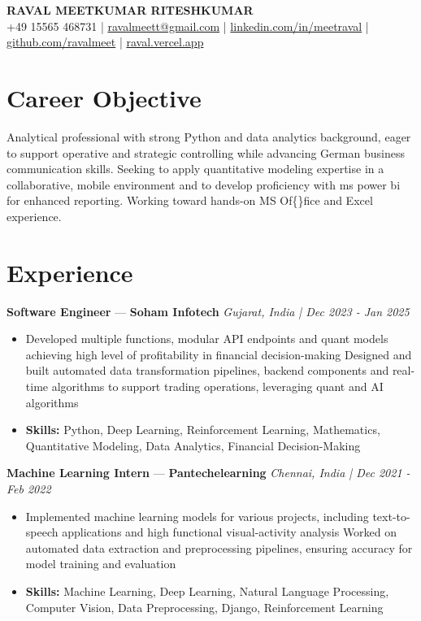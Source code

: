 \documentclass[a4paper,10pt]{article}
\begin{document}
\begin{center}
  {\Large\bfseries RAVAL MEETKUMAR RITESHKUMAR}\\[2pt]
  {\small +49 15565 468731 \;|\; \href{mailto:ravalmeett@gmail.com}{ravalmeett@gmail.com} \;|\; \href{https://www.linkedin.com/in/meetraval/}{linkedin.com/in/meetraval} \;|\; \href{https://github.com/ravalmeet}{github.com/ravalmeet} \;|\; \href{https://raval.vercel.app/}{raval.vercel.app}}
\end{center}
\vspace{-3pt}

\section*{Career Objective}
Analytical professional with strong Python and data analytics background, eager to support operative and strategic controlling while advancing German business communication skills. Seeking to apply quantitative modeling expertise in a collaborative, mobile environment and to develop proficiency with ms power bi for enhanced reporting. Working toward hands-on MS Of\{\}fice and Excel experience.\par

\section*{Experience}
\textbf{Software Engineer} — \textbf{Soham Infotech} \hfill \textit{Gujarat, India \;|\; Dec 2023 - Jan 2025}\par
\vspace{1pt}
\begin{itemize}
  \item Developed multiple functions, modular API endpoints and quant models achieving high level of profitability in financial decision-making Designed and built automated data transformation pipelines, backend components and real-time algorithms to support trading operations, leveraging quant and AI algorithms
  \item \textbf{Skills:} Python, Deep Learning, Reinforcement Learning, Mathematics, Quantitative Modeling, Data Analytics, Financial Decision-Making
\end{itemize}
\vspace{3pt}
\textbf{Machine Learning Intern} — \textbf{Pantechelearning} \hfill \textit{Chennai, India \;|\; Dec 2021 - Feb 2022}\par
\vspace{1pt}
\begin{itemize}
  \item Implemented machine learning models for various projects, including text-to-speech applications and high functional visual-activity analysis Worked on automated data extraction and preprocessing pipelines, ensuring accuracy for model training and evaluation
  \item \textbf{Skills:} Machine Learning, Deep Learning, Natural Language Processing, Computer Vision, Data Preprocessing, Django, Reinforcement Learning
\end{itemize}
\end{document}

